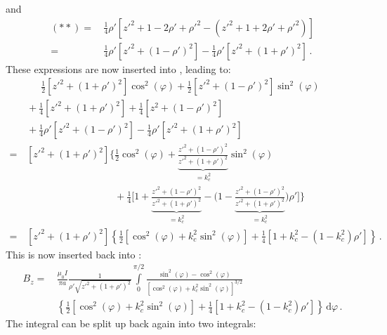 and
\begin{align}
  (**)
 =&\, \frac{1}{4} \rho' \left[ z'^2 + 1 - 2 \rho' + \rho'^2 - \left( z'^2 + 1 + 2 \rho' + \rho'^2 \right) \right] \nonumber \\
 =&\, \frac{1}{4} \rho' \left[ z'^2 + ( 1 - \rho')^2 \right] - \frac{1}{4} \rho' \left[ z'^2 + (1 + \rho')^2 \right] \, .
\end{align}
These expressions are now inserted into , leading to:
\begin{align}
 ~&\, \phantom{+}~
        \frac{1}{2} \left[ z'^2 + (1 + \rho')^2 \right] \cos^2(\varphi) + \frac{1}{2} \left[ z'^2 + (1 - \rho')^2 \right] \sin^2(\varphi) \nonumber \\
 ~&\, + \frac{1}{4} \left[ z'^2 + (1 + \rho')^2 \right] + \frac{1}{4} \left[ z^2 + (1 - \rho')^2 \right] \nonumber \\
 ~&\, + \frac{1}{4} \rho' \left[ z'^2 + ( 1 - \rho')^2 \right] - \frac{1}{4} \rho' \left[ z'^2 + (1 + \rho')^2 \right] \nonumber \\
 =&\, \left[ z'^2 + (1 + \rho')^2 \right] \Biggl\{
        \frac{1}{2} \cos^2(\varphi) + \underbrace{\frac{z'^2 + (1 - \rho')^2}{z'^2 + (1 + \rho')^2}}_{=k_c^2} \sin^2(\varphi) \nonumber \\
 ~&\, \phantom{\left[ z'^2 + (1 + \rho')^2 \right] \Biggl\{}
        + \frac{1}{4} \Biggl[ 1 + \underbrace{\frac{z'^2 + (1 - \rho')^2}{z'^2 + (1 + \rho')^2}}_{=k_c^2}
                              - \Biggl( 1 - \underbrace{\frac{z'^2 + (1 - \rho')^2}{z'^2 + (1 + \rho')^2}}_{=k_c^2} \Biggr) \rho' \Biggr] \Biggr\} \nonumber \\
 =&\, \left[ z'^2 + (1 + \rho')^2 \right] \left\{
          \frac{1}{2} \left[ \cos^2(\varphi) + k_c^2 \sin^2(\varphi) \right]
        + \frac{1}{4} \left[ 1 + k_c^2 - \left( 1 - k_c^2 \right) \rho' \right] \right\} \, .
\end{align}
This is now inserted back into :
\begin{align}
  B_z
 =&\, \frac{\mu_0 I}{\pi a}
      \frac{1}{\rho' \sqrt{z'^2 + (1 + \rho')^2}}
      \int\limits_0^{\pi/2}
        \frac{\sin^2(\varphi) - \cos^2(\varphi)}
             {\left[\cos^2(\varphi) + k_c^2 \sin^2(\varphi) \right]^{3/2}} \nonumber \\
 ~&\,   \left\{   \frac{1}{2} \left[ \cos^2(\varphi) + k_c^2 \sin^2(\varphi) \right]
                + \frac{1}{4} \left[ 1 + k_c^2 - \left( 1 - k_c^2 \right) \rho' \right] \right\} \,\mathrm{d}\varphi \, .
\end{align}
The integral can be split up back again into two integrals:
